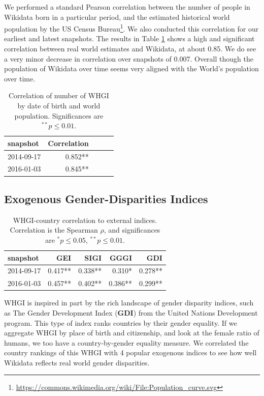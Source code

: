 \documentclass[letterpaper]{article}
\begin{document}
We performed a standard Pearson correlation between the number of people in Wikidata born in a particular period, and the estimated historical world population by the US Census
Bureau\footnote{\url{https://commons.wikimedia.org/wiki/File:Population_curve.svg}}.
We also conducted this correlation for our earliest and latest snapshots. The results in Table \ref{table:worldpop} shows a high and significant correlation between real world estimates and Wikidata, at about 0.85. We do see a very minor decrease in correlation over snapshots of 0.007. Overall though the population of Wikidata over time seems very aligned with the World's population over time.

\begin{table}
\caption{Correlation of number of WHGI by date of birth and world population. Significances are $ ^{**}p\leq 0.01$.}
\label{table:worldpop}
\begin{tabular}{lrrrr}
\toprule
snapshot &  Correlation \\
\midrule
2014-09-17 & 0.852**  \\
2016-01-03 & 0.845**  \\
\bottomrule
\end{tabular}
\end{table}

\subsection{Exogenous Gender-Disparities Indices}
\begin{table}
\caption{WHGI-country correlation to external indices. Correlation is the Spearman $\rho$, and significances are $ ^*p\leq 0.05 $, $ ^{**}p\leq 0.01$.}
\label{table:scores}
\begin{tabular}{lrrrr}
\toprule
snapshot &  GEI &  SIGI &  GGGI &  GDI  \\
\midrule
2014-09-17 &  0.417** &       0.338** &          0.310* &         0.278**  \\
2016-01-03 &  0.457** &       0.402** &          0.386** &         0.299**  \\
\bottomrule
\end{tabular}
\end{table}

WHGI is inspired in part by the rich landscape of gender disparity indices, such as The Gender Development Index (\textbf{GDI}) from the United Nations Development program. This type of index ranks countries by their gender equality. If we aggregate WHGI by place of birth and citizenship, and look at the female ratio of humans, we too have a country-by-gender equality measure.  We correlated the country rankings of this WHGI with 4 popular exogenous indices to see how well Wikidata reflects real world gender disparities. 
\end{document}
